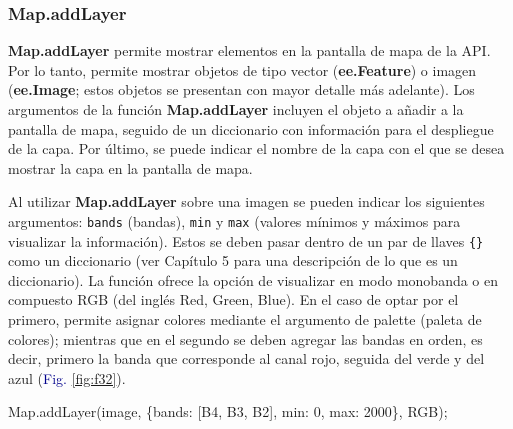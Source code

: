 \documentclass[
  12pt,
  letterpaper,
  twoside]{book}
\newenvironment{Shaded}{\begin{snugshade}}{\end{snugshade}}
\newcommand{\DataTypeTok}[1]{\textcolor[rgb]{0.00,0.00,0.00}{#1}}
\newcommand{\DecValTok}[1]{\textcolor[rgb]{0.28,0.53,0.93}{#1}}
\newcommand{\FunctionTok}[1]{\textcolor[rgb]{0.48,0.12,0.64}{#1}}
\newcommand{\KeywordTok}[1]{\textcolor[rgb]{0.48,0.12,0.64}{#1}}
\newcommand{\NormalTok}[1]{#1}
\newcommand{\OperatorTok}[1]{\textcolor[rgb]{0.00,0.00,0.00}{#1}}
\newcommand{\StringTok}[1]{\textcolor[rgb]{0.87,0.29,0.22}{#1}}
\newcommand\boldpurple[1]{\textcolor{darkpurple}{\textbf{#1}}}
\begin{document}
\hypertarget{map.addlayer}{%
\subsubsection*{Map.addLayer}\label{map.addlayer}}

\boldpurple{Map.addLayer} permite mostrar elementos en la pantalla de mapa de la API. Por lo tanto, permite mostrar objetos de tipo vector (\boldpurple{ee.Feature}) o imagen (\boldpurple{ee.Image}; estos objetos se presentan con mayor detalle más adelante). Los argumentos de la función \boldpurple{Map.addLayer} incluyen el objeto a añadir a la pantalla de mapa, seguido de un diccionario con información para el despliegue de la capa. Por último, se puede indicar el nombre de la capa con el que se desea mostrar la capa en la pantalla de mapa.

Al utilizar \boldpurple{Map.addLayer} sobre una imagen se pueden indicar los siguientes argumentos: \texttt{bands} (bandas), \texttt{min} y \texttt{max} (valores mínimos y máximos para visualizar la información). Estos se deben pasar dentro de un par de llaves \texttt{\{\}} como un diccionario (ver Capítulo 5 para una descripción de lo que es un diccionario). La función ofrece la opción de visualizar en modo monobanda o en compuesto RGB (del inglés Red, Green, Blue). En el caso de optar por el primero, permite asignar colores mediante el argumento de palette (paleta de colores); mientras que en el segundo se deben agregar las bandas en orden, es decir, primero la banda que corresponde al canal rojo, seguida del verde y del azul (\textcolor{darkblue}{Fig.} \ref{fig:f32}).

\begin{Shaded}
\begin{Highlighting}[]
\KeywordTok{Map}\OperatorTok{.}\FunctionTok{addLayer}\NormalTok{(image}\OperatorTok{,}\NormalTok{ \{}\DataTypeTok{bands}\OperatorTok{:}\NormalTok{ [}\StringTok{\textquotesingle{}B4\textquotesingle{}}\OperatorTok{,} \StringTok{\textquotesingle{}B3\textquotesingle{}}\OperatorTok{,} \StringTok{\textquotesingle{}B2\textquotesingle{}}\NormalTok{]}\OperatorTok{,} 
                      \DataTypeTok{min}\OperatorTok{:} \DecValTok{0}\OperatorTok{,} \DataTypeTok{max}\OperatorTok{:} \DecValTok{2000}\NormalTok{\}}\OperatorTok{,} 
                      \StringTok{\textquotesingle{}RGB\textquotesingle{}}\NormalTok{)}\OperatorTok{;}
\end{Highlighting}
\end{Shaded}
\end{document}
